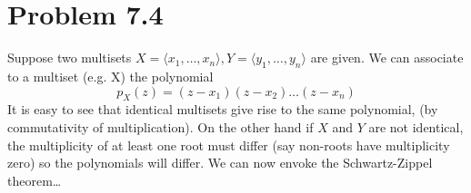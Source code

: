 \section{Problem 7.4}

Suppose two multisets
$X=\langle x_1, \dots, x_n\rangle,Y=\langle y_1, \dots, y_n \rangle$ are given.
We can associate to a multiset (e.g. X) the polynomial
\[ p_X(z) = (z - x_1)(z - x_2) \dots (z - x_n) \]
It is easy to see that identical multisets give rise to the same polynomial,
(by commutativity of multiplication).
On the other hand if $X$ and $Y$ are not identical,
the multiplicity of at least one root must differ
(say non-roots have multiplicity zero) so the polynomials will differ.
We can now envoke the Schwartz-Zippel theorem\ldots %

